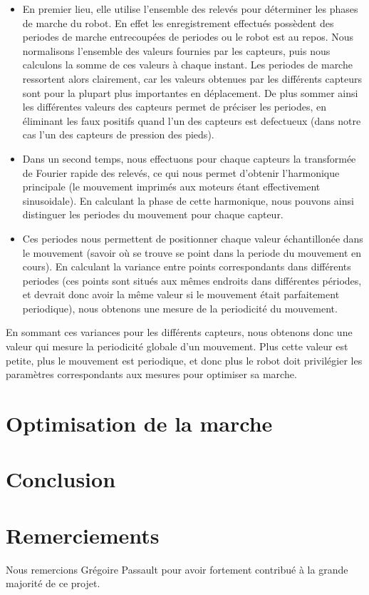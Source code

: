\documentclass[11pt]{article}
\begin{document}
\begin{itemize}
\item En premier lieu, elle utilise l'ensemble des relevés pour déterminer les phases de marche du robot. En effet les enregistrement effectués possèdent des periodes de marche entrecoupées de periodes ou le robot est au repos. Nous normalisons l'ensemble des valeurs fournies par les capteurs, puis nous calculons la somme de ces valeurs à chaque instant. Les periodes de marche ressortent alors clairement, car les valeurs obtenues par les différents capteurs sont pour la plupart plus importantes en déplacement. De plus sommer ainsi les différentes valeurs des capteurs permet de préciser les periodes, en éliminant les faux positifs quand l'un des capteurs est defectueux (dans notre cas l'un des capteurs de pression des pieds).
\item Dans un second temps, nous effectuons pour chaque capteurs la transformée de Fourier rapide des relevés, ce qui nous permet d'obtenir l'harmonique principale (le mouvement imprimés aux moteurs étant effectivement sinusoidale). En calculant la phase de cette harmonique, nous pouvons ainsi distinguer les periodes du mouvement pour chaque capteur.
\item Ces periodes nous permettent de positionner chaque valeur échantillonée dans le mouvement (savoir où se trouve se point dans la periode du mouvement en cours). En calculant la variance entre points correspondants dans différents periodes (ces points sont situés aux mêmes endroits dans différentes périodes, et devrait donc avoir la même valeur si le mouvement était parfaitement periodique), nous obtenons une mesure de la periodicité du mouvement. 
\end{itemize}
En sommant ces variances pour les différents capteurs,
nous obtenons donc une valeur qui mesure la periodicité globale d'un mouvement. Plus cette valeur est petite, plus le mouvement est periodique, et donc plus le robot doit privilégier les paramètres correspondants aux mesures pour optimiser sa marche. 

\section{Optimisation de la marche}
\section{Conclusion}

\section{Remerciements}
Nous remercions Grégoire Passault pour avoir fortement contribué à la grande majorité de ce projet.
\end{document}

